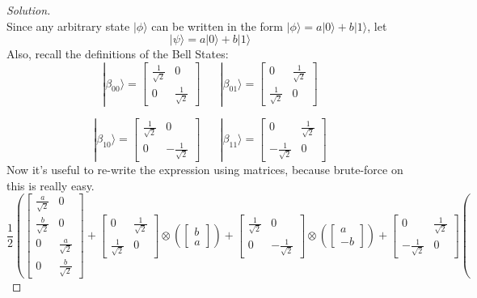 \documentclass[12pt]{article}
\begin{document}
\begin{proof}[Solution]~\\
Since any arbitrary state $|\phi\rangle$ can be written in the form $|\phi\rangle=a|0\rangle+b|1\rangle$, let
$$|\psi\rangle=a|0\rangle+b|1\rangle$$
Also, recall the definitions of the Bell States:
$$|\beta_{00}\rangle=\begin{bmatrix}
\frac{1}{\sqrt{2}} & 0\\
0 & \frac{1}{\sqrt{2}}
\end{bmatrix}\;\;\;\;\;\;|\beta_{01}\rangle=\begin{bmatrix}
0 & \frac{1}{\sqrt{2}}\\
\frac{1}{\sqrt{2}} & 0
\end{bmatrix}$$

$$|\beta_{10}\rangle=\begin{bmatrix}
\frac{1}{\sqrt{2}} & 0\\
0 & -\frac{1}{\sqrt{2}}
\end{bmatrix}\;\;\;\;\;\;|\beta_{11}\rangle=\begin{bmatrix}
0 & \frac{1}{\sqrt{2}}\\
-\frac{1}{\sqrt{2}} & 0
\end{bmatrix}$$
Now it's useful to re-write the expression using matrices, because brute-force on this is really easy.
$$\frac{1}{2}\left(\begin{bmatrix}
\frac{a}{\sqrt{2}} & 0\\
\frac{b}{\sqrt{2}} & 0\\
0 & \frac{a}{\sqrt{2}}\\
0 & \frac{b}{\sqrt{2}}
\end{bmatrix}
+\begin{bmatrix}
0 & \frac{1}{\sqrt{2}}\\
\frac{1}{\sqrt{2}} & 0
\end{bmatrix}\otimes\left(\begin{bmatrix}
b\\
a
\end{bmatrix}\right)+\begin{bmatrix}
\frac{1}{\sqrt{2}} & 0\\
0 & -\frac{1}{\sqrt{2}}
\end{bmatrix}\otimes\left(\begin{bmatrix}
a\\-b
\end{bmatrix}\right)+\begin{bmatrix}
0 & \frac{1}{\sqrt{2}}\\
-\frac{1}{\sqrt{2}} & 0
\end{bmatrix}\left(
$$
\end{proof}
\end{document}
